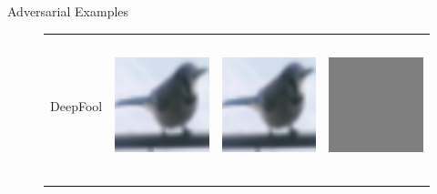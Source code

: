 \documentclass[final]{beamer}
\newlength{\onecolwid}
\newlength{\twocolwid}
\begin{document}
\begin{frame}[t]
\begin{columns}[t]
\begin{column}{\twocolwid}
\begin{columns}[t,totalwidth=\twocolwid]
\begin{column}{\onecolwid}
\begin{block}{Adversarial Examples}
\begin{figure}[h]
\begin{tabular}{rlll}
								DeepFool & \includegraphics[height=4cm, align=c]{../figures/deepfool_orig.pdf} & \includegraphics[height=4cm, align=c]{../figures/deepfool_adversarial.pdf} & \includegraphics[height=4cm, align=c]{../figures/deepfool_diff.pdf}\\
								\\

\end{tabular}
\end{figure}
\end{block}
\end{column}
\end{columns}
\end{column}
\end{columns}
\end{frame}
\end{document}
